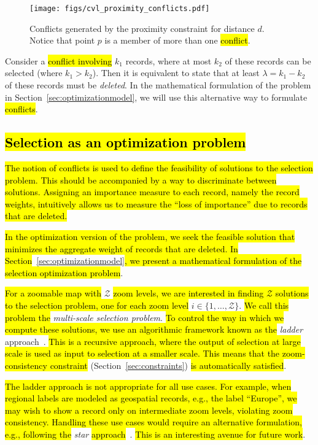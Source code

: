 \begin{figure}[htbp]
\begin{center}
\texttt{[image: figs/cvl\_proximity\_conflicts.pdf]}
\caption{Conflicts generated by the proximity constraint for distance $d$. Notice that point $p$ is a member of more than one \hl{conflict}.}
\label{fig:proximity:conflict}
\end{center}
\vspace*{-4ex}
\end{figure}

Consider a \hl{conflict involving} $k_1$ records, where at most $k_2$ of these records can be selected (where $k_1 > k_2$). Then it is equivalent to state that at least $\lambda = k_1 - k_2$ of these records must be \emph{deleted}. In the mathematical formulation of the problem in Section~\ref{sec:optimizationmodel}, we will use this alternative way to formulate \hl{conflicts}.

\subsection{\hl{Selection as an optimization problem}}
\label{sec:filtering}
\hl{The notion of conflicts is used to define the feasibility of solutions to the selection problem. This should be accompanied by a way to discriminate between solutions. Assigning an importance measure to each record, namely the record weights, intuitively allows us to measure the ``loss of importance'' due to records that are deleted.} 

\hl{In the optimization version of the problem, we seek the feasible solution that minimizes the aggregate weight of records that are deleted. In Section}~\ref{sec:optimizationmodel}\hl{, we present a mathematical formulation of the selection optimization problem}.

\hl{For a zoomable map with }$\mathcal{Z}$\hl{ zoom levels, we are interested in finding $\mathcal{Z}$ solutions to the selection problem, one for each zoom level }$i \in \{ 1, \ldots, \mathcal{Z} \}$. \hl{We call this problem the }\emph{multi-scale selection problem}. \hl{To control the way in which we compute these solutions, we use an algorithmic framework known as the }\emph{ladder} approach~\cite{foerster2010challenges}. \hl{This is a recursive approach, where the output of selection at large scale is used as input to selection at a smaller scale. This means that the zoom-consistency constraint }(Section~\ref{sec:constraints})\hl{ is automatically satisfied}.

\hl{The ladder approach is not appropriate for all use cases. For example, when regional labels are modeled as geospatial records, e.g., the label ``Europe'', we may wish to show a record only on intermediate zoom levels, violating zoom consistency. Handling these use cases would require an alternative formulation, e.g., following the }\emph{star} \hl{approach}~\cite{foerster2010challenges}. \hl{This is an interesting avenue for future work}.  




